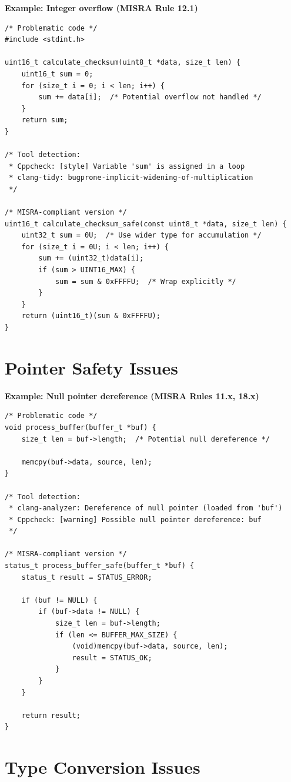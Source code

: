 \documentclass[11pt,letterpaper]{report}
\begin{document}
\textbf{Example: Integer overflow (MISRA Rule 12.1)}

\begin{verbatim}
/* Problematic code */
#include <stdint.h>

uint16_t calculate_checksum(uint8_t *data, size_t len) {
    uint16_t sum = 0;
    for (size_t i = 0; i < len; i++) {
        sum += data[i];  /* Potential overflow not handled */
    }
    return sum;
}

/* Tool detection:
 * Cppcheck: [style] Variable 'sum' is assigned in a loop
 * clang-tidy: bugprone-implicit-widening-of-multiplication
 */

/* MISRA-compliant version */
uint16_t calculate_checksum_safe(const uint8_t *data, size_t len) {
    uint32_t sum = 0U;  /* Use wider type for accumulation */
    for (size_t i = 0U; i < len; i++) {
        sum += (uint32_t)data[i];
        if (sum > UINT16_MAX) {
            sum = sum & 0xFFFFU;  /* Wrap explicitly */
        }
    }
    return (uint16_t)(sum & 0xFFFFU);
}
\end{verbatim}

\section{Pointer Safety Issues}

\textbf{Example: Null pointer dereference (MISRA Rules 11.x, 18.x)}

\begin{verbatim}
/* Problematic code */
void process_buffer(buffer_t *buf) {
    size_t len = buf->length;  /* Potential null dereference */

    memcpy(buf->data, source, len);
}

/* Tool detection:
 * clang-analyzer: Dereference of null pointer (loaded from 'buf')
 * Cppcheck: [warning] Possible null pointer dereference: buf
 */

/* MISRA-compliant version */
status_t process_buffer_safe(buffer_t *buf) {
    status_t result = STATUS_ERROR;

    if (buf != NULL) {
        if (buf->data != NULL) {
            size_t len = buf->length;
            if (len <= BUFFER_MAX_SIZE) {
                (void)memcpy(buf->data, source, len);
                result = STATUS_OK;
            }
        }
    }

    return result;
}
\end{verbatim}

\section{Type Conversion Issues}
\end{document}
